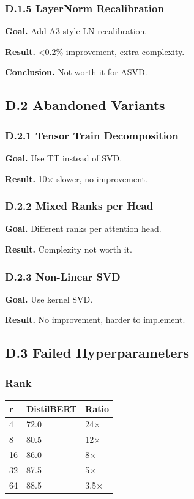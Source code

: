 \subsubsection{D.1.5 LayerNorm Recalibration}

\textbf{Goal.} Add A3-style LN recalibration.

\textbf{Result.} <0.2\% improvement, extra complexity.

\textbf{Conclusion.} Not worth it for ASVD.

\subsection{D.2 Abandoned Variants}

\subsubsection{D.2.1 Tensor Train Decomposition}

\textbf{Goal.} Use TT instead of SVD.

\textbf{Result.} 10$\times$ slower, no improvement.

\subsubsection{D.2.2 Mixed Ranks per Head}

\textbf{Goal.} Different ranks per attention head.

\textbf{Result.} Complexity not worth it.

\subsubsection{D.2.3 Non-Linear SVD}

\textbf{Goal.} Use kernel SVD.

\textbf{Result.} No improvement, harder to implement.

\subsection{D.3 Failed Hyperparameters}

\subsubsection{Rank}

\begin{table}[H]
\centering
\small
\begin{tabular}{lll}
\toprule
\textbf{r} & \textbf{DistilBERT} & \textbf{Ratio} \\
\midrule
4 & 72.0 & 24$\times$ \\
8 & 80.5 & 12$\times$ \\
16 & 86.0 & 8$\times$ \\
32 & 87.5 & 5$\times$ \\
64 & 88.5 & 3.5$\times$ \\
\bottomrule
\end{tabular}
\end{table}

